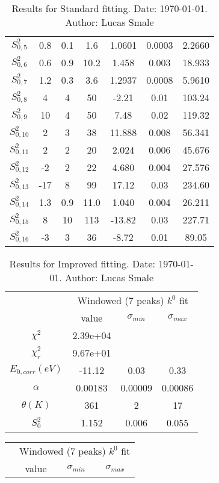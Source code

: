 \documentclass{article}
\begin{document}
\begin{landscape}
\begin{table}[ht]
\begin{tabular}{c||c|c|c||c|c|c}
$S^2_{0,5}$& 0.8 & 0.1 & 1.6 & 1.0601 & 0.0003 & 2.2660 \\
$S^2_{0,6}$& 0.6 & 0.9 & 10.2 & 1.458 & 0.003 & 18.933 \\
$S^2_{0,7}$& 1.2 & 0.3 & 3.6 & 1.2937 & 0.0008 & 5.9610 \\
$S^2_{0,8}$& 4 & 4 & 50 & -2.21 & 0.01 & 103.24 \\
$S^2_{0,9}$& 10 & 4 & 50 & 7.48 & 0.02 & 119.32 \\
$S^2_{0,10}$& 2 & 3 & 38 & 11.888 & 0.008 & 56.341 \\
$S^2_{0,11}$& 2 & 2 & 20 & 2.024 & 0.006 & 45.676 \\
$S^2_{0,12}$& -2 & 2 & 22 & 4.680 & 0.004 & 27.576 \\
$S^2_{0,13}$& -17 & 8 & 99 & 17.12 & 0.03 & 234.60 \\
$S^2_{0,14}$& 1.3 & 0.9 & 11.0 & 1.040 & 0.004 & 26.211 \\
$S^2_{0,15}$& 8 & 10 & 113 & -13.82 & 0.03 & 227.71 \\
$S^2_{0,16}$& -3 & 3 & 36 & -8.72 & 0.01 & 89.05 \\
\hline
\end{tabular}
 \caption{Results for Standard fitting. Date: \today. Author: Lucas Smale}
\end{table}
\begin{table}[ht]
\centering
\begin{tabular}{c||c|c|c}
\hline
&\multicolumn{3}{|c}{Windowed (7 peaks) $k^{0}$ fit}\\
& value & $\sigma_{min}$ & $\sigma_{max}$\\
\hline
$\chi^2$   & 2.39e+04 & & \\
$\chi^2_r$ & 9.67e+01 & & \\
\hline
$E_{0,corr} (eV)$& -11.12 & 0.03 & 0.33 \\
$\alpha $       & 0.00183 & 0.00009 & 0.00086 \\
$\theta (K) $   & 361 & 2 & 17 \\
$S^2_{0}$& 1.152 & 0.006 & 0.055 \\
\hline
\end{tabular}
 \caption{Results for Improved fitting. Date: \today. Author: Lucas Smale}
\end{table}
\begin{table}[ht]
\centering
\begin{tabular}{c||c|c|c}
\hline
&\multicolumn{3}{|c}{Windowed (7 peaks) $k^{0}$ fit}\\
& value & $\sigma_{min}$ & $\sigma_{max}$\\

\end{tabular}
\end{table}
\end{landscape}
\end{document}
